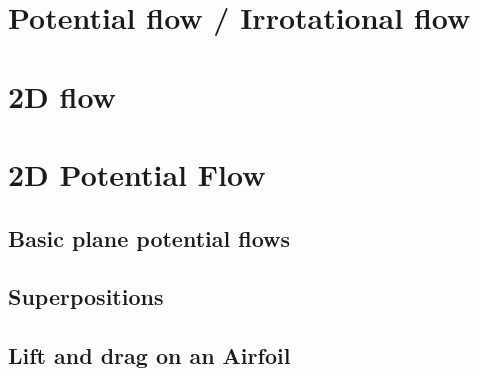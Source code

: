 \section{Potential flow / Irrotational flow}

\section{2D flow}

\section{2D Potential Flow}

\subsection{Basic plane potential flows}
\subsection{Superpositions}
\subsection{Lift and drag on an Airfoil}